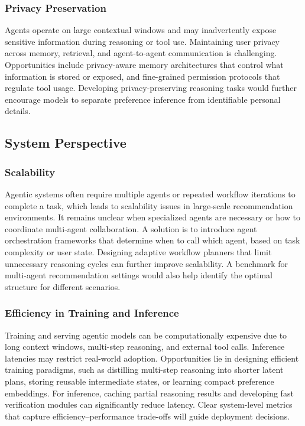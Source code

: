 \subsubsection{Privacy Preservation}
Agents operate on large contextual windows and may inadvertently expose sensitive information during reasoning or tool use. Maintaining user privacy across memory, retrieval, and agent-to-agent communication is challenging.
Opportunities include privacy-aware memory architectures that control what information is stored or exposed, and fine-grained permission protocols that regulate tool usage. Developing privacy-preserving reasoning tasks would further encourage models to separate preference inference from identifiable personal details.

\subsection{System Perspective}\label{subsec:challenge_system}

\subsubsection{Scalability}
Agentic systems often require multiple agents or repeated workflow iterations to complete a task, which leads to scalability issues in large-scale recommendation environments. It remains unclear when specialized agents are necessary or how to coordinate multi-agent collaboration.
A solution is to introduce agent orchestration frameworks that determine when to call which agent, based on task complexity or user state. Designing adaptive workflow planners that limit unnecessary reasoning cycles can further improve scalability. A benchmark for multi-agent recommendation settings would also help identify the optimal structure for different scenarios.

\subsubsection{Efficiency in Training and Inference}
Training and serving agentic models can be computationally expensive due to long context windows, multi-step reasoning, and external tool calls. Inference latencies may restrict real-world adoption.
Opportunities lie in designing efficient training paradigms, such as distilling multi-step reasoning into shorter latent plans, storing reusable intermediate states, or learning compact preference embeddings. For inference, caching partial reasoning results and developing fast verification modules can significantly reduce latency. Clear system-level metrics that capture efficiency–performance trade-offs will guide deployment decisions.

